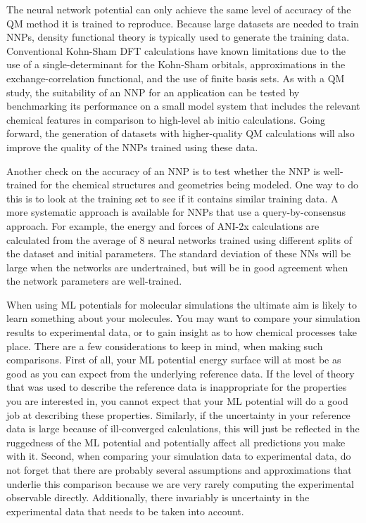 \documentclass[9pt,bestpractices]{livecoms}
\begin{document}
The neural network potential can only achieve the same level of accuracy of the
QM method it is trained to reproduce. Because large datasets are needed to train
NNPs, density functional theory is typically used to generate the training data.
Conventional Kohn-Sham DFT calculations have known limitations due to the use of
a single-determinant for the Kohn-Sham orbitals, approximations in the
exchange-correlation functional, and the use of finite basis sets. As with a QM
study, the suitability of an NNP for an application can be tested by
benchmarking its performance on a small model system that includes the relevant
chemical features in comparison to high-level ab initio calculations. Going
forward, the generation of datasets with higher-quality QM calculations will
also improve the quality of the NNPs trained using these data.

Another check on the accuracy of an NNP is to test whether the NNP is
well-trained for the chemical structures and geometries being modeled. One way
to do this is to look at the training set to see if it contains similar training
data. A more systematic approach is available for NNPs that use a
query-by-consensus approach. For example, the energy and forces of ANI-2x
calculations are calculated from the average of 8 neural networks trained using
different splits of the dataset and initial parameters. The standard deviation
of these NNs will be large when the networks are undertrained, but will be in
good agreement when the network parameters are well-trained.





When using ML potentials for molecular simulations the ultimate aim is likely to
learn something about your molecules. You may want to compare your simulation
results to experimental data, or to gain insight as to how chemical processes
take place. There are a few considerations to keep in mind, when making such
comparisons.  First of all, your ML potential energy surface will at most be as
good as you can expect from the underlying reference data. If the level of
theory that was used to describe the reference data is inappropriate for the
properties you are interested in, you cannot expect that your ML potential will
do a good job at describing these properties. Similarly, if the uncertainty in
your reference data is large because of ill-converged calculations, this will
just be reflected in the ruggedness of the ML potential and potentially affect
all predictions you make with it.  Second, when comparing your simulation data
to experimental data, do not forget that there are probably several assumptions
and approximations that underlie this comparison because we are very rarely
computing the experimental observable directly. Additionally, there invariably
is uncertainty in the experimental data that needs to be taken into
account\cite{vangunsterenValidationMolecularSimulation2018}.
\end{document}
